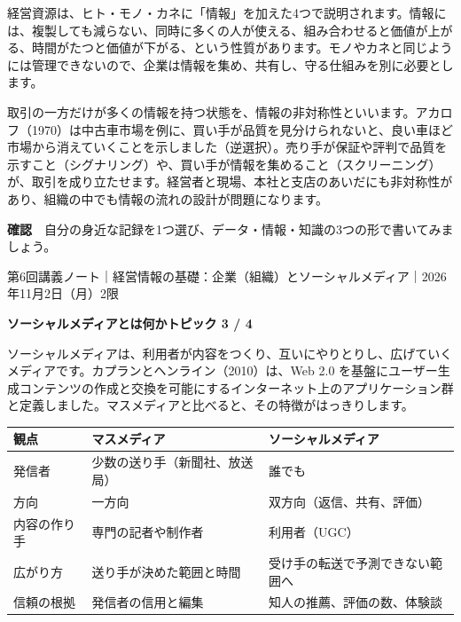 \documentclass[paper=a4paper,fontsize=10pt,line_length=170mm,number_of_lines=46,baselineskip=1.6zw]{jlreq}
\newcommand\topichead[4]{%
  {\sffamily\footnotesize\color{grayt}#1\par}\vspace{1.5mm}
  {\sffamily\bfseries\LARGE #4}\hfill\colorbox{accent}{\sffamily\footnotesize\bfseries トピック #2 / #3}\par
  \vspace{1.2mm}{\color{ink}\hrule height 0.6pt}\vspace{3mm}}
\newcommand\subhead[1]{\par\vspace{2.6mm}{\sffamily\bfseries\large #1}\par\vspace{1.3mm}}
\begin{document}
\subhead{経営資源としての情報}
経営資源は、ヒト・モノ・カネに「情報」を加えた4つで説明されます。情報には、複製しても減らない、同時に多くの人が使える、組み合わせると価値が上がる、時間がたつと価値が下がる、という性質があります。モノやカネと同じようには管理できないので、企業は情報を集め、共有し、守る仕組みを別に必要とします。\par\vspace{1.2mm}
\subhead{情報の非対称性}
取引の一方だけが多くの情報を持つ状態を、情報の非対称性といいます。アカロフ（1970）は中古車市場を例に、買い手が品質を見分けられないと、良い車ほど市場から消えていくことを示しました（逆選択）。売り手が保証や評判で品質を示すこと（シグナリング）や、買い手が情報を集めること（スクリーニング）が、取引を成り立たせます。経営者と現場、本社と支店のあいだにも非対称性があり、組織の中でも情報の流れの設計が問題になります。\par\vspace{1.2mm}
\begin{checkbox}
{\sffamily\bfseries 確認}　自分の身近な記録を1つ選び、データ・情報・知識の3つの形で書いてみましょう。\par
\end{checkbox}
\clearpage
\topichead{第6回講義ノート｜経営情報の基礎：企業（組織）とソーシャルメディア｜2026年11月2日（月）2限}{3}{4}{ソーシャルメディアとは何か}
ソーシャルメディアは、利用者が内容をつくり、互いにやりとりし、広げていくメディアです。カプランとヘンライン（2010）は、Web 2.0 を基盤にユーザー生成コンテンツの作成と交換を可能にするインターネット上のアプリケーション群と定義しました。マスメディアと比べると、その特徴がはっきりします。\par\vspace{1.2mm}
\subhead{マスメディアとの比較}
\begin{center}\small\renewcommand{\arraystretch}{1.15}\setlength{\tabcolsep}{1.5mm}
\begin{tabular}{|p{24.0mm}|p{68.0mm}|p{68.0mm}|}\arrayrulecolor{rulec}\hline
\rowcolor{papertwo}\sffamily\bfseries 観点 & \sffamily\bfseries マスメディア & \sffamily\bfseries ソーシャルメディア\\\hline
発信者 & 少数の送り手（新聞社、放送局） & 誰でも\\\hline
方向 & 一方向 & 双方向（返信、共有、評価）\\\hline
内容の作り手 & 専門の記者や制作者 & 利用者（UGC）\\\hline
広がり方 & 送り手が決めた範囲と時間 & 受け手の転送で予測できない範囲へ\\\hline
信頼の根拠 & 発信者の信用と編集 & 知人の推薦、評価の数、体験談\\\hline
\end{tabular}\end{center}\vspace{0.5mm}
\end{document}
